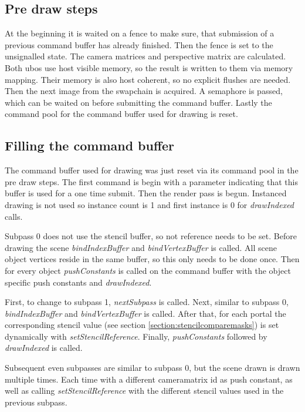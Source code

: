 \subsection{Pre draw steps}

At the beginning it is waited on a fence to make sure, that submission of a previous command buffer has already finished. Then the fence is set to the unsignalled state. The camera matrices and perspective matrix are calculated. Both \glspl{ubo} use host visible memory, so the result is written to them via memory mapping. Their memory is also host coherent, so no explicit flushes are needed.
Then the next image from the swapchain is acquired. A semaphore is passed, which can be waited on before submitting the command buffer.
Lastly the command pool for the command buffer used for drawing is reset.

\subsection{Filling the command buffer}
The command buffer used for drawing was just reset via its command pool in the pre draw steps. The first command is begin with a parameter indicating that this buffer is used for a one time submit. Then the render pass is begun. Instanced drawing is not used so instance count is 1 and first instance is 0 for \textit{drawIndexed} calls.

Subpass 0 does not use the stencil buffer, so not reference needs to be set. Before drawing the scene \textit{bindIndexBuffer} and \textit{bindVertexBuffer} is called. All scene object vertices reside in the same buffer, so this only needs to be done once. Then for every object \textit{pushConstants} is called on the command buffer with the object specific push constants and \textit{drawIndexed}. 

First, to change to subpass 1, \textit{nextSubpass} is called. Next, similar to subpass 0, \textit{bindIndexBuffer} and \textit{bindVertexBuffer} is called. After that, for each portal the corresponding stencil value (see section \ref{section:stencilcomparemasks}) is set dynamically with \textit{setStencilReference}. Finally, \textit{pushConstants} followed by \textit{drawIndexed} is called.

Subsequent even subpasses are similar to subpass 0, but the scene drawn is drawn multiple times. Each time with a different \gls{cameramatrix} id as push constant, as well as calling \textit{setStencilReference} with the different stencil values used in the previous subpass.

